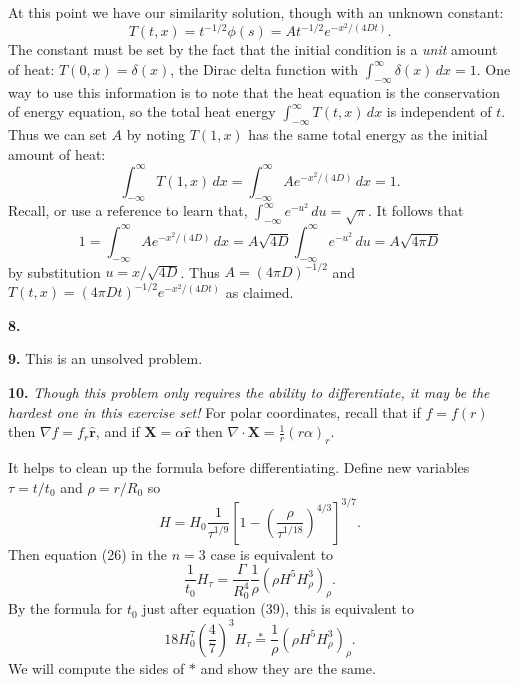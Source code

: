 \documentclass[10pt]{amsart}
\newcommand{\mfile}[1]{
\begin{quote}
\bigskip
\VerbatimInput[frame=single,label=\fbox{\normalsize \textsl{\,#1\,}},fontfamily=courier,fontsize=\footnotesize]{#1}
\end{quote}
}
\newcommand{\Div}{\nabla\cdot}
\newcommand{\grad}{\nabla}
\newcommand{\prob}[1]{\bigskip\noindent\large\textbf{#1.}\normalsize }
\begin{document}
At this point we have our similarity solution, though with an unknown constant:
    $$T(t,x) = t^{-1/2} \phi(s) = A t^{-1/2} e^{- x^2/(4Dt)}.$$
The constant must be set by the fact that the initial condition is a \emph{unit} amount of heat: $T(0,x) = \delta(x)$, the Dirac delta function with $\int_{-\infty}^\infty \delta(x)\,dx = 1$.  One way to use this information is to note that the heat equation is the conservation of energy equation, so the total heat energy $\int_{-\infty}^\infty T(t,x)\,dx$ is independent of $t$.  Thus we can set $A$ by noting $T(1,x)$ has the same total energy as the initial amount of heat:
    $$\int_{-\infty}^\infty T(1,x)\,dx = \int_{-\infty}^\infty A e^{- x^2/(4D)}\,dx = 1.$$
Recall, or use a reference to learn that, $\int_{-\infty}^\infty e^{- u^2}\,du = \sqrt{\pi}$.  It follows that
    $$1 = \int_{-\infty}^\infty A e^{- x^2/(4D)}\,dx = A \sqrt{4D} \int_{-\infty}^\infty e^{- u^2}\,du = A \sqrt{4\pi D}$$
by substitution $u=x/\sqrt{4D}$.  Thus $A = (4\pi D)^{-1/2}$ and $T(t,x) = (4\pi D t)^{-1/2} e^{- x^2/(4Dt)}$ as claimed.

\prob{8}

\mfile{verifyheat.m}

\prob{9}  This is an unsolved problem.

\prob{10}  \emph{Though this problem only requires the ability to differentiate, it may be the hardest one in this exercise set!}  For polar coordinates, recall that if $f=f(r)$ then $\grad f = f_r \hat{\mathbf{r}}$, and if $\mathbf{X}=\alpha \hat{\mathbf{r}}$ then $\Div \mathbf{X} = \frac{1}{r} \left(r \alpha\right)_r$.

It helps to clean up the formula before differentiating.  Define new variables $\tau = t/t_0$ and $\rho = r/R_0$ so
    $$H = H_0 \frac{1}{\tau^{1/9}} \left[1 - \left( \frac{\rho}{\tau^{1/18}} \right)^{4/3}\right]^{3/7}.$$
Then equation (26) in the $n=3$ case is equivalent to
    $$\frac{1}{t_0} H_\tau = \frac{\Gamma}{R_0^4} \frac{1}{\rho} \left(\rho H^5 H_\rho^3\right)_\rho.$$
By the formula for $t_0$ just after equation (39), this is equivalent to
    $$18 H_0^7 \left(\frac{4}{7}\right)^3 H_\tau \stackrel{\ast}{=} \frac{1}{\rho} \left(\rho H^5 H_\rho^3\right)_\rho.$$
We will compute the sides of $\ast$ and show they are the same.
\end{document}

